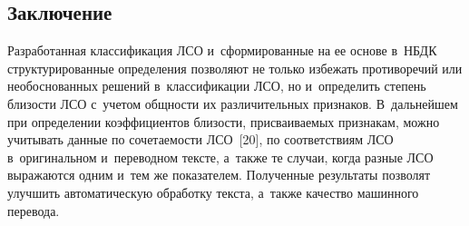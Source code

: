 \begin{multicols}{2}
{}

\vspace*{-6pt}

\section{Заключение}

  Разработанная классификация ЛСО и~сформированные на ее основе в~НБДК 
структурированные определения поз\-во\-ля\-ют не только избежать противоречий 
или необоснованных решений в~классификации ЛСО, но и~определить степень 
бли\-зости ЛСО с~учетом общ\-ности их раз\-ли\-чи\-тель\-ных при\-зна\-ков. 
В~дальнейшем при определении коэффициентов бли\-зости, при\-сва\-и\-ва\-емых 
при\-зна\-кам, мож\-но учитывать данные по со\-че\-та\-е\-мости ЛСО~[20], по 
соответствиям ЛСО в~оригинальном и~переводном текс\-те, а~так\-же те случаи, 
когда раз\-ные ЛСО выражаются одним и~тем же показателем. Полученные 
результаты поз\-во\-лят улучшить автоматическую обработку текс\-та, а~так\-же 
качество машинного пе\-ре\-вода.

\vspace*{-6pt}
  
{\small\frenchspacing
 { %
 \begin{thebibliography}{99}


\end{thebibliography}}}
\end{multicols}

